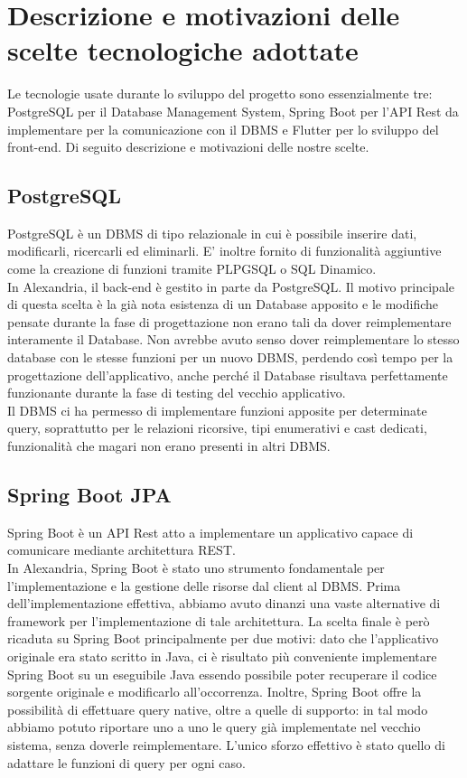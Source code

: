 \raggedright{\section{Descrizione e motivazioni delle scelte tecnologiche adottate}
Le tecnologie usate durante lo sviluppo del progetto sono essenzialmente tre: PostgreSQL per il Database Management System, Spring Boot per l'API Rest da implementare per la comunicazione con il DBMS e Flutter per lo sviluppo del front-end. Di seguito descrizione e motivazioni delle nostre scelte.

\raggedright{\subsection{PostgreSQL}}
PostgreSQL è un \gls{DBMS} di tipo relazionale in cui è possibile inserire dati, modificarli,  ricercarli ed eliminarli. E' inoltre fornito di funzionalità aggiuntive come la creazione di funzioni tramite PLPGSQL o SQL Dinamico. \\
In Alexandria, il back-end è gestito in parte da PostgreSQL. Il motivo principale di questa scelta è la già nota esistenza di un Database apposito e le modifiche pensate durante la fase di progettazione non erano tali da dover reimplementare interamente il Database. Non avrebbe avuto senso dover reimplementare lo stesso database con le stesse funzioni per un nuovo DBMS, perdendo così tempo per la progettazione dell'applicativo, anche perché il Database risultava perfettamente funzionante durante la fase di testing del vecchio applicativo. \\
Il DBMS ci ha permesso di implementare funzioni apposite per determinate query, soprattutto per le relazioni ricorsive, tipi enumerativi e cast dedicati, funzionalità che magari non erano presenti in altri DBMS. \newpage
\raggedright{\subsection{Spring Boot JPA}}
\gls{Spring Boot} è un API Rest atto a implementare un applicativo capace di comunicare mediante architettura REST. \\
In Alexandria, Spring Boot è stato uno strumento fondamentale per l'implementazione e la gestione delle risorse dal client al DBMS. Prima dell'implementazione effettiva, abbiamo avuto dinanzi una vaste alternative di framework per l'implementazione di tale architettura. La scelta finale è però ricaduta su Spring Boot principalmente per due motivi: dato che l'applicativo originale era stato scritto in Java, ci è risultato più conveniente implementare Spring Boot su un eseguibile Java essendo possibile poter recuperare il codice sorgente originale e modificarlo all'occorrenza. Inoltre, Spring Boot offre la possibilità di effettuare query native, oltre a quelle di supporto: in tal modo abbiamo potuto riportare uno a uno le query già implementate nel vecchio sistema, senza doverle reimplementare. L'unico sforzo effettivo è stato quello di adattare le funzioni di query per ogni caso.  \\
}
